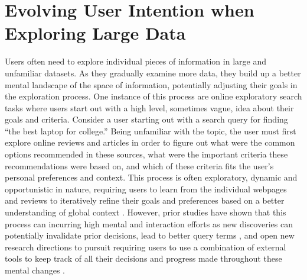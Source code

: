 \section{Evolving User Intention when Exploring Large Data}

Users often need to explore individual pieces of information in large and unfamiliar datasets. As they gradually examine more data, they build up a better mental landscape of the space of information, potentially adjusting their goals in the exploration process. One instance of this process are online exploratory search tasks where users start out with a high level, sometimes vague, idea about their goals and criteria. Consider a user starting out with a search query for finding “the best laptop for college.” Being unfamiliar with the topic, the user must first explore online reviews and articles in order to figure out what were the common options recommended in these sources, what were the important criteria these recommendations were based on, and which of these criteria fits the user’s personal preferences and context. This process is often exploratory, dynamic and opportunistic in nature, requiring users to learn from the individual webpages and reviews to iteratively refine their goals and preferences based on a better understanding of global context \cite{marchionini2006exploratory}. However, prior studies have shown that this process can incurring high mental and interaction efforts as new discoveries can potentially invalidate prior decisions, lead to better query terms \cite{belkin2003query,salton1990improving}, and open new research directions to pursuit \cite{pirolli1999information,pirolli2005sensemaking} requiring users to use a combination of external tools to keep track of all their decisions and progress made throughout these mental changes \cite{capra2010tools}.  

